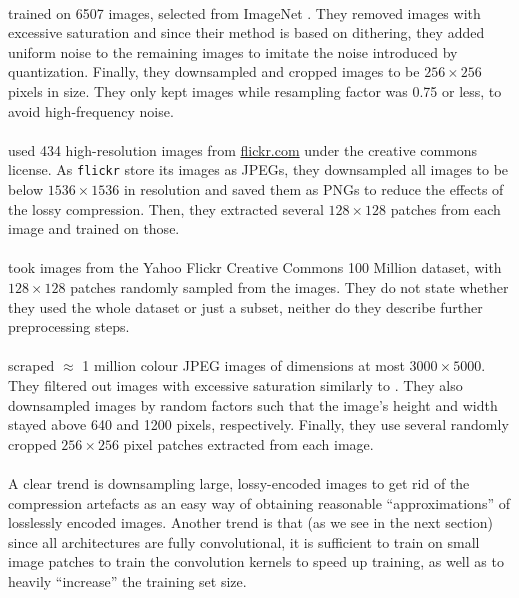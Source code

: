 \paragraph{\cite{balle2016end}} trained on 6507 images, selected from ImageNet
\cite{deng2009imagenet}. They removed images with excessive saturation and
since their method is based on dithering, they added uniform noise to the
remaining images to imitate the noise introduced by quantization. Finally,
they downsampled and cropped images to be $256 \times 256$ pixels in size.
They only kept images while resampling factor was 0.75 or less, to
avoid high-frequency noise.

\paragraph{\cite{theis2017lossy}} used 434 high-resolution images from \url{flickr.com}
under the creative commons license. As \texttt{flickr} store its images as
JPEGs, they downsampled all images to be below $1536 \times 1536$ in
resolution and saved them as PNGs to reduce the effects of the lossy
compression. Then, they extracted several $128 \times 128$ patches from each
image and trained on those.

\paragraph{\cite{rippel2017real}} took images from the Yahoo Flickr Creative Commons
100 Million dataset, with $128 \times 128$ patches randomly sampled from the
images. They do not state whether they used the whole dataset or just a
subset, neither do they describe further preprocessing steps.

\paragraph{\cite{balle2018variational}} scraped $\approx$ 1 million colour JPEG images
of dimensions at most $3000 \times 5000$. They filtered out images with
excessive saturation similarly to \cite{balle2016end}. They also
downsampled images by random factors such that the image's height and width
stayed above 640 and 1200 pixels, respectively. Finally, they use several
randomly cropped $256 \times 256$ pixel patches extracted from each image.

\paragraph{}
A clear trend is downsampling large, lossy-encoded images to get rid of the
compression artefacts as an easy way of obtaining reasonable ``approximations''
of losslessly encoded images. Another trend is that (as we see in the next
section) since all architectures are fully convolutional, it is sufficient to
train on small image patches to train the convolution kernels to speed up
training, as well as to heavily ``increase'' the training set size.

